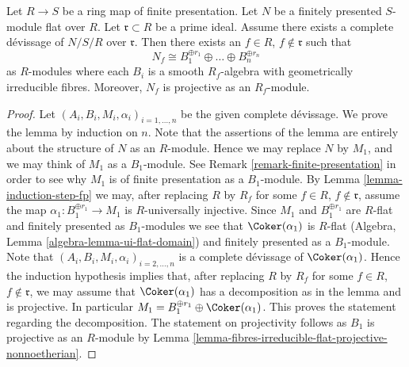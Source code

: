 \begin{lemma}
\label{lemma-complete-devissage-flat-finitely-presented-module}
Let $R \to S$ be a ring map of finite presentation.
Let $N$ be a finitely presented $S$-module flat over $R$.
Let $\mathfrak r \subset R$ be a prime ideal.
Assume there exists a complete d\'evissage of $N/S/R$ over $\mathfrak r$.
Then there exists an $f \in R$, $f \not \in \mathfrak r$
such that
$$
N_f \cong B_1^{\oplus r_1} \oplus \ldots \oplus B_n^{\oplus r_n}
$$
as $R$-modules where each $B_i$ is a smooth $R_f$-algebra with geometrically
irreducible fibres. Moreover, $N_f$ is projective as an $R_f$-module.
\end{lemma}

\begin{proof}
Let $(A_i, B_i, M_i, \alpha_i)_{i = 1, \ldots, n}$ be the given
complete d\'evissage. We prove the lemma by induction on $n$.
Note that the assertions of the lemma are entirely about the structure
of $N$ as an $R$-module. Hence we may replace $N$ by $M_1$, and we
may think of $M_1$ as a $B_1$-module. See
Remark \ref{remark-finite-presentation}
in order to see why $M_1$ is of finite presentation as a $B_1$-module. By
Lemma \ref{lemma-induction-step-fp}
we may, after replacing $R$ by $R_f$ for some
$f \in R$, $f \not \in \mathfrak r$, assume
the map $\alpha_1 : B_1^{\oplus r_1} \to M_1$ is $R$-universally injective.
Since $M_1$ and $B_1^{\oplus r_1}$ are $R$-flat and finitely presented as
$B_1$-modules we see that $\Coker(\alpha_1)$ is $R$-flat
(Algebra, Lemma \ref{algebra-lemma-ui-flat-domain})
and finitely presented as a $B_1$-module. Note that
$(A_i, B_i, M_i, \alpha_i)_{i = 2, \ldots, n}$ is a complete
d\'evissage of $\Coker(\alpha_1)$. Hence the induction hypothesis
implies that, after replacing
$R$ by $R_f$ for some $f \in R$, $f \not \in \mathfrak r$,
we may assume that $\Coker(\alpha_1)$ has a decomposition
as in the lemma and is projective. In particular
$M_1 = B_1^{\oplus r_1} \oplus \Coker(\alpha_1)$.
This proves the statement regarding the decomposition.
The statement on projectivity follows as $B_1$ is projective as
an $R$-module by
Lemma \ref{lemma-fibres-irreducible-flat-projective-nonnoetherian}.
\end{proof}
